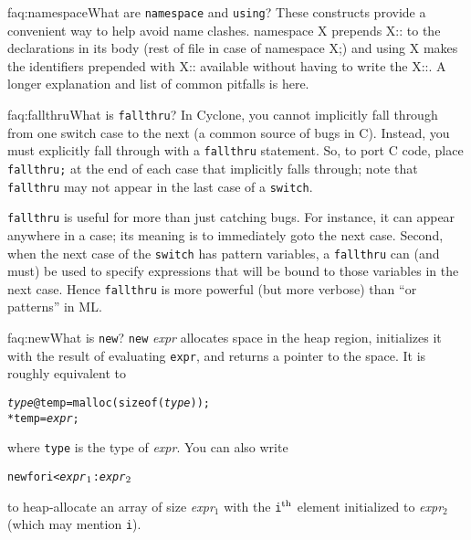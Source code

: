 \begin{faqa}{faq:namespace}{What are \texttt{namespace} and \texttt{using}?}
These constructs provide a convenient way to help avoid name clashes.
namespace X prepends X:: to the declarations in its body (rest of file
in case of namespace X;) and using X makes the identifiers prepended
with X:: available without having to write the X::.  A longer
explanation and list of common pitfalls is here.
\end{faqa}

\begin{faqa}{faq:fallthru}{What is \texttt{fallthru}?}
In Cyclone, you cannot implicitly fall through from one switch case to
the next (a common source of bugs in C).  Instead, you must explicitly
fall through with a \texttt{fallthru} statement.  So, to port C code,
place \texttt{fallthru;} at the end of each case that implicitly falls
through; note that \texttt{fallthru} may not appear in the last case
of a \texttt{switch}.

\texttt{fallthru} is useful for more than just catching bugs.  For
instance, it can appear anywhere in a case; its meaning is to
immediately goto the next case.  Second, when the next case of the
\texttt{switch} has pattern variables, a \texttt{fallthru} can (and
must) be used to specify expressions that will be bound to those
variables in the next case.  Hence \texttt{fallthru} is more powerful
(but more verbose) than ``or patterns'' in ML\@.
\end{faqa}

\begin{faqa}{faq:new}{What is \texttt{new}?}
\texttt{new} \textit{expr} allocates space in the heap region,
initializes it with the result of evaluating \texttt{expr}, and
returns a pointer to the space.  It is roughly equivalent to
\begin{alltt}
 \textit{type} @temp = malloc(sizeof(\textit{type}));
 *temp = \textit{expr};
\end{alltt}
where \texttt{type} is the type of \textit{expr}.  You can also write
\begin{alltt}
  new \lb for i < \textit{expr}\(\sb{1}\) : \textit{expr}\(\sb{2}\) \rb
\end{alltt}
to heap-allocate an array of size \textit{expr}$_1$ with the
\texttt{i}$^{\rm th}$ element initialized to \textit{expr}$_2$ (which
may mention \texttt{i}).
\end{faqa}

